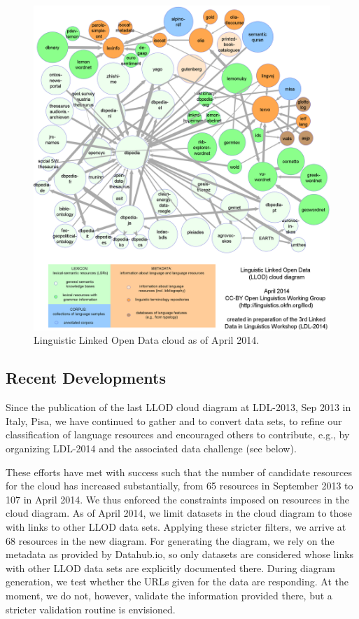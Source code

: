 \begin{figure}[t]
 \begin{center}
 \includegraphics[width=1.0\textwidth]{llod-colored.png}
 \end{center}
\caption{Linguistic Linked Open Data cloud as of April 2014.}
\label{figI18nLOD}
\end{figure}

\subsection{Recent Developments}

Since the publication of the last LLOD cloud diagram at LDL-2013, Sep 2013 in Italy, Pisa, we have continued to gather and to convert data sets, to refine our classification of language resources and encouraged others to contribute, e.g., by organizing LDL-2014 and the associated data challenge (see below).

These efforts have met with success such that the number of candidate resources for the cloud has increased substantially, from 65 resources in September 2013 to 107 in April 2014. 
We thus enforced the constraints imposed on resources in the cloud diagram. As of April 2014, we limit datasets in the cloud diagram to those with links to other LLOD data sets. 
Applying these stricter filters, we arrive at 68 resources in the new diagram.
For generating the diagram, we rely on the metadata as provided by Datahub.io, so only datasets are considered whose links with other LLOD data sets are explicitly documented there.
During diagram generation, we test whether the URLs given for the data are responding. At the moment, we do not, however, validate the information provided there, but a stricter validation routine is envisioned. 

